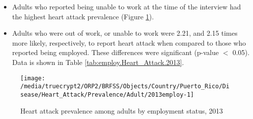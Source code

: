  
 \newpage
\begin{itemize}


\item Adults who reported being unable to work at the time of the interview had the highest heart attack prevalence (Figure \ref{fig:employ.Heart_Attack.2013}).

\item Adults who were out of work, or unable to work were 2.21, and 2.15 times more likely, respectively, to report heart attack when compared to those who reported being employed. These differences were significant (p-value $<$ 0.05). 
Data is shown in Table \ref{tab:employ.Heart_Attack.2013}.


\end{itemize}

\begin{figure}[H]
\caption{Heart attack prevalence among adults by employment status, 
         2013}
\label{fig:employ.Heart_Attack.2013}
\begin{knitrout}
\color{fgcolor}

{\centering \texttt{[image: /media/truecrypt2/ORP2/BRFSS/Objects/Country/Puerto\_Rico/Disease/Heart\_Attack/Prevalence/Adult/2013employ-1]} 

}



\end{knitrout}
 \end{figure}


